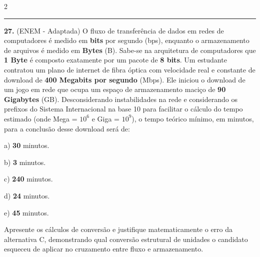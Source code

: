 \documentclass[twoside, 10pt, a4paper]{article}
\begin{document}
\begin{multicols*}{2}
\noindent\textcolor{CorLinha}{\rule{\linewidth}{0.5pt}} 
\par\par\vspace{0.5cm}
\textbf{27.} (ENEM - Adaptada) O fluxo de transferência de dados em redes de computadores é medido em \textbf{bits} por segundo (bps), enquanto o armazenamento de arquivos é medido em \textbf{Bytes} (B). Sabe-se na arquitetura de computadores que \textbf{1 Byte} é composto exatamente por um pacote de \textbf{8 bits}. Um estudante contratou um plano de internet de fibra óptica com velocidade real e constante de download de \textbf{400 Megabits por segundo} (Mbps). Ele iniciou o download de um jogo em rede que ocupa um espaço de armazenamento maciço de \textbf{90 Gigabytes} (GB).
Desconsiderando instabilidades na rede e considerando os prefixos do Sistema Internacional na base 10 para facilitar o cálculo do tempo estimado (onde Mega = $10^6$ e Giga = $10^9$), o tempo teórico mínimo, em minutos, para a conclusão desse download será de:

a) \textbf{30} minutos.\par\par\vspace{0.5cm}
b) \textbf{3} minutos.\par\par\vspace{0.5cm}
c) \textbf{240} minutos.\par\par\vspace{0.5cm}
d) \textbf{24} minutos.\par\par\vspace{0.5cm}
e) \textbf{45} minutos.\par\par\vspace{0.5cm}

Apresente os cálculos de conversão e justifique matematicamente o erro da alternativa C, demonstrando qual conversão estrutural de unidades o candidato esqueceu de aplicar no cruzamento entre fluxo e armazenamento.
\par\vspace{0.5cm}


\end{multicols*}
\end{document}
